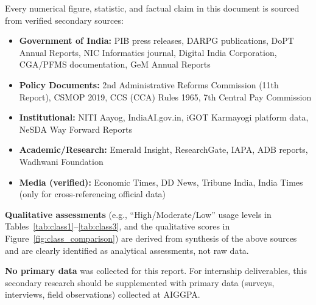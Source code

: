 \documentclass[12pt,a4paper]{article}
\begin{document}
\begin{warningbox}
Every numerical figure, statistic, and factual claim in this document is sourced from verified secondary sources:

\begin{itemize}
  \item \textbf{Government of India:} PIB press releases, DARPG publications, DoPT Annual Reports, NIC Informatics journal, Digital India Corporation, CGA/PFMS documentation, GeM Annual Reports
  \item \textbf{Policy Documents:} 2nd Administrative Reforms Commission (11th Report), CSMOP 2019, CCS (CCA) Rules 1965, 7th Central Pay Commission
  \item \textbf{Institutional:} NITI Aayog, IndiaAI.gov.in, iGOT Karmayogi platform data, NeSDA Way Forward Reports
  \item \textbf{Academic/Research:} Emerald Insight, ResearchGate, IAPA, ADB reports, Wadhwani Foundation
  \item \textbf{Media (verified):} Economic Times, DD News, Tribune India, India Times (only for cross-referencing official data)
\end{itemize}

\textbf{Qualitative assessments} (e.g., ``High/Moderate/Low'' usage levels in Tables~\ref{tab:class1}--\ref{tab:class3}, and the qualitative scores in Figure~\ref{fig:class_comparison}) are derived from synthesis of the above sources and are clearly identified as analytical assessments, not raw data.

\textbf{No primary data} was collected for this report. For internship deliverables, this secondary research should be supplemented with primary data (surveys, interviews, field observations) collected at AIGGPA.
\end{warningbox}
\end{document}
